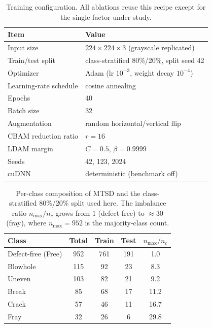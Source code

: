 \documentclass[a4paper,fleqn]{cas-sc}
\begin{document}
\begin{sloppypar}
	\begin{table}[pos=htbp]
		\footnotesize
		\caption{Training configuration. All ablations reuse this recipe except for the single factor under study.}
		\label{tbl:hyper}
		\centering
		\setlength{\tabcolsep}{2pt}
		\begin{tabular}{ll}
			\hline
			\textbf{Item} & \textbf{Value} \\ \hline
			Input size & $224{\times}224{\times}3$ (grayscale replicated) \\
			Train/test split & class-stratified 80\%/20\%, split seed 42 \\
			Optimizer & Adam (lr $10^{-3}$, weight decay $10^{-4}$) \\
			Learning-rate schedule & cosine annealing \\
			Epochs & 40 \\
			Batch size & 32 \\
			Augmentation & random horizontal/vertical flip \\
			CBAM reduction ratio & $r=16$ \\
			LDAM margin & $C=0.5$, $\beta=0.9999$ \\
			Seeds & 42, 123, 2024 \\
			cuDNN & deterministic (benchmark off) \\ \hline
		\end{tabular}
	\end{table}

	\begin{table}[pos=htbp]
		\footnotesize
		\caption{Per-class composition of MTSD and the class-stratified 80\%/20\% split used here. The imbalance ratio $n_{\max}/n_c$ grows from $1$ (defect-free) to $\approx$30 (fray), where $n_{\max}=952$ is the majority-class count.}
		\label{tbl:data}
		\centering
		\begin{tabular}{lcccc}
			\hline
			\textbf{Class} & \textbf{Total} & \textbf{Train} & \textbf{Test} & \textbf{$n_{\max}/n_c$} \\ \hline
			Defect-free (Free) & 952 & 761 & 191 & 1.0 \\
			Blowhole & 115 & 92 & 23 & 8.3 \\
			Uneven & 103 & 82 & 21 & 9.2 \\
			Break & 85 & 68 & 17 & 11.2 \\
			Crack & 57 & 46 & 11 & 16.7 \\
			Fray & 32 & 26 & 6 & 29.8 \\ \hline
		\end{tabular}
	\end{table}


\end{sloppypar}
\end{document}
